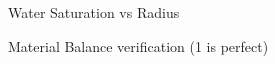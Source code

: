 \documentclass[12pt,letterpaper,titlepage]{article}
\begin{document}
\begin{figure}[p]
\caption{\label{sw}Water Saturation vs Radius}
\end{figure}
\begin{figure}[p]
\caption{\label{mb}Material Balance verification (1 is perfect)}
\end{figure}
\end{document}
